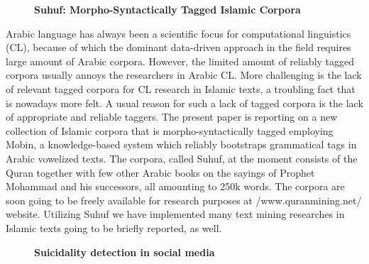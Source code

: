 \documentclass[10pt, a4paper, twopage, headinclude, footinclude, BCOR5mm]{book}
\begin{document}
\newpage

\begin{figure}[t!]
\centering
\large\textbf{Suhuf: Morpho-Syntactically Tagged Islamic Corpora}
\vspace*{0.5cm}
\end{figure}


\begin{table}[t!]
\end{table} 
\noindent
Arabic language has always been a scientific focus for computational linguistics (CL), because of which the dominant data-driven approach in the field requires large amount of Arabic corpora. However, the limited amount of reliably tagged corpora usually annoys the researchers in Arabic CL. More challenging is the lack of relevant tagged corpora for CL research in Islamic texts, a troubling fact that is nowadays more felt. A usual reason for such a lack of tagged corpora is the lack of appropriate and reliable taggers. The present paper is reporting on a new collection of Islamic corpora that is morpho-syntactically tagged employing Mobin, a knowledge-based system which reliably bootstraps grammatical tags in Arabic vowelized texts. The corpora, called Suhuf, at the moment consists of the Quran together with few other Arabic books on the sayings of Prophet Mohammad and his successors, all amounting to 250k words. The corpora are soon going to be freely available for research purposes at /www.quranmining.net/ website. Utilizing Suhuf we have implemented many text mining researches in Islamic texts going to be briefly reported, as well.  

\newpage

\begin{figure}[t!]
\centering
\large\textbf{Suicidality detection in social media}
\vspace*{0.5cm}
\end{figure}
\end{document}
